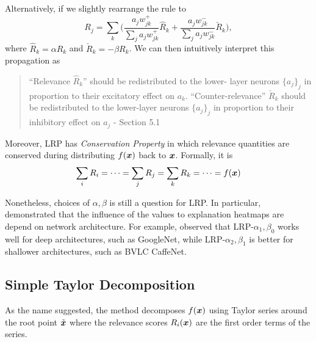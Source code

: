 Alternatively, if we slightly rearrange  the rule to 
$$
	R_j = \sum_{k} \bigg( \frac{a_j w_{jk}^+}{\sum_{j} a_jw_{jk}^+} \hat{R}_{k} + \frac{a_j w_{jk}^-}{\sum_{j} a_jw_{jk}^-} \check{R}_{k} \bigg),
$$ 
where $\hat{R}_{k}  = \alpha R_{k}$ and  $\check{R}_{k} = -\beta R_{k} $. We can then intuitively interpret this propagation as 

\begin{quote}
``Relevance $\hat{R}_k$'' should be redistributed to the lower-
layer neurons $\{a_j\}_j$ in proportion to their excitatory effect on $a_k$. ``Counter-relevance'' $\check{R}_k $ should be redistributed to the lower-layer neurons $\{a_j\}_j$ in proportion to their inhibitory effect on $a_j$
	- Section 5.1 \cite{MontavonMethodsInterpretingUnderstanding2017}
\end{quote} 

Moreover, LRP has \textit{Conservation Property} in which relevance quantities are conserved during distributing $f(\patvector{x})$ back to $\boldsymbol{x}$. Formally, it is 
\begin{align}
	\sum_{i} R_i =  \cdots =	\sum_{j} R_j = \sum_{k} R_k = \cdots = f(\patvector{x})
\end{align}


Nonetheless, choices of $\alpha,\beta$ is still a question for LRP.  In particular, \cite{MontavonMethodsInterpretingUnderstanding2017, BinderLayerWiseRelevancePropagation2016} demonstrated that the influence of the values to explanation heatmaps are depend on network architecture. For example, \cite{MontavonMethodsInterpretingUnderstanding2017} observed that LRP-${\alpha_1, \beta_0}$ works well for deep architectures, such as GoogleNet\cite{SzegedyGoingDeeperConvolutions2014}, while LRP-${\alpha_2, \beta_1}$ is better for shallower architectures, such as BVLC CaffeNet\cite{JiaCaffeConvolutionalArchitecture2014}.


%




\subsection{Simple Taylor Decomposition}
As the name suggested,  the method decomposes $f(\patvector{x})$ using Taylor series around the root point $\tilde{\boldsymbol{x}}$ where the relevance scores $R_i(\boldsymbol{x})$ are the first order terms of the series.


